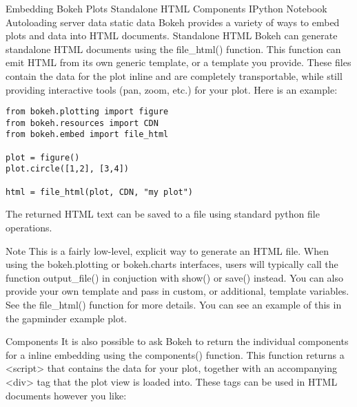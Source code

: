 Embedding Bokeh Plots
Standalone HTML
Components
IPython Notebook
Autoloading
server data
static data
Bokeh provides a variety of ways to embed plots and data into HTML documents.
Standalone HTML
Bokeh can generate standalone HTML documents using the file_html() function. This function can emit HTML from its own generic template, or a template you provide. These files contain the data for the plot inline and are completely transportable, while still providing interactive tools (pan, zoom, etc.) for your plot. Here is an example:

\begin{framed}
\begin{verbatim}
from bokeh.plotting import figure
from bokeh.resources import CDN
from bokeh.embed import file_html

plot = figure()
plot.circle([1,2], [3,4])

html = file_html(plot, CDN, "my plot")

\end{verbatim}
\end{framed}

The returned HTML text can be saved to a file using standard python file operations.

Note
This is a fairly low-level, explicit way to generate an HTML file. When using the bokeh.plotting or bokeh.charts interfaces, users will typically call the function output_file() in conjuction with show() or save() instead.
You can also provide your own template and pass in custom, or additional, template variables. See the file_html() function for more details. You can see an example of this in the gapminder example plot.

Components
It is also possible to ask Bokeh to return the individual components for a inline embedding using the components() function. This function returns a <script> that contains the data for your plot, together with an accompanying <div> tag that the plot view is loaded into. These tags can be used in HTML documents however you like:

